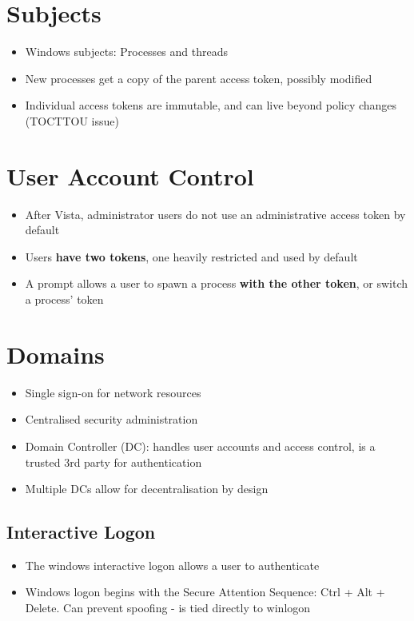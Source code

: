 \documentclass{article}
\begin{document}
\section{Subjects}
\begin{itemize}
  \item Windows subjects: Processes and threads 
  \item New processes get a copy of the parent access token, possibly modified 
  \item Individual access tokens are immutable, and can live beyond policy changes (TOCTTOU issue)
\end{itemize}

\section{User Account Control}
\begin{itemize}
  \item After Vista, administrator users do not use an administrative access token by default 
  \item Users \textbf{have two tokens}, one heavily restricted and used by default 
  \item A prompt allows a user to spawn a process \textbf{with the other token}, or switch a process’ token
\end{itemize}

\section{Domains}  
\begin{itemize}
  \item Single sign-on for network resources 
  \item Centralised security administration 
  \item Domain Controller (DC): handles user accounts and access control, is a trusted 3rd party for authentication 
  \item Multiple DCs allow for decentralisation by design
\end{itemize}

\subsection{Interactive Logon}
\begin{itemize}
  \item The windows interactive logon allows a user to authenticate 
  \item Windows logon begins with the Secure Attention Sequence: Ctrl + Alt + Delete. Can prevent spoofing - is tied directly to winlogon
\end{itemize}
\end{document}
